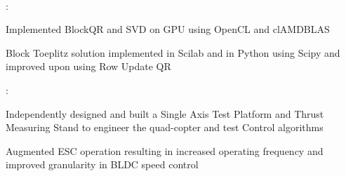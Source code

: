 \documentclass[]{hemant-style}
\begin{document}
\begin{minipage}[]{\textwidth}
\begin{minipage}{\textwidth}
\begin{minipage}[t][][c]{.75\textwidth}
                             \\
                            :
                            \begin{hitemize}
                                \item Implemented BlockQR and SVD on GPU using OpenCL and clAMDBLAS
                                \item Block Toeplitz solution implemented in Scilab and in Python using Scipy and improved upon using Row Update QR
                            \end{hitemize}
                            :
                            \begin{hitemize}
                                \item Independently designed and built a Single Axis Test Platform and Thrust Measuring Stand to engineer the quad-copter and test Control algorithms
                                \item Augmented ESC operation resulting in increased operating frequency  and improved granularity in BLDC speed control
                            \end{hitemize}
                            \vspace{1em}
                             \\
                            \\
                            \end{minipage}
                \end{minipage}
        \end{minipage}
        
    
\end{document}
